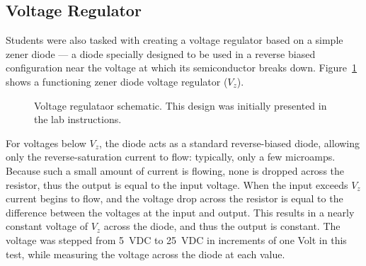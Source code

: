 \subsection{Voltage Regulator}
Students were also tasked with creating a voltage regulator based on a simple
zener diode --- a diode specially designed to be used in a reverse biased
configuration near the voltage at which its semiconductor breaks down.
Figure~\ref{fig:schem3} shows a functioning zener diode voltage regulator ($V_z$).
%
\begin{figure}[H]
	\centering
	
	\caption{Voltage regulataor schematic.  This design was initially presented in the lab instructions.}
	\label{fig:schem3}
\end{figure}
%
For voltages below $V_z$, the diode acts as a standard reverse-biased diode,
allowing only the reverse-saturation current to flow: typically, only a few
microamps.  Because such a small amount of current is flowing, none is dropped
across the resistor, thus the output is equal to the input voltage.  When the
input exceeds $V_z$ current begins to flow, and the voltage drop across the
resistor is equal to the difference between the voltages at the input and
output.  This results in a nearly constant voltage of $V_z$ across the diode,
and thus the output is constant.  The voltage was stepped from \SI{5}{\volt}DC
to \SI{25}{\volt}{DC} in increments of one Volt in this test, while measuring
the voltage across the diode at each value.

\begin{figure}[H]

\end{figure}

